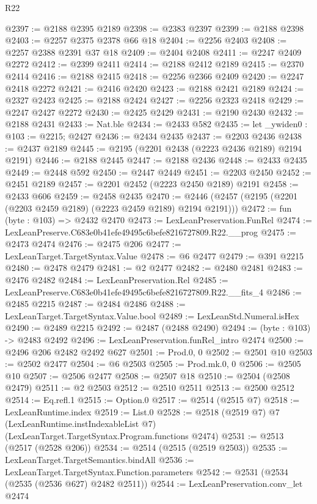 \begin{lexlean}{R22}
\begin{coremodule}
@2397 := @2188 @2395 @2189
@2398 := @2383 @2397
@2399 := @2188 @2398
@2403 := @2257 @2375 @2378 @66 @18
@2404 := @2256 @2403
@2408 := @2257 @2388 @2391 @37 @18
@2409 := @2404 @2408
@2411 := @2247 @2409 @2272
@2412 := @2399 @2411
@2414 := @2188 @2412 @2189
@2415 := @2370 @2414
@2416 := @2188 @2415
@2418 := @2256 @2366 @2409
@2420 := @2247 @2418 @2272
@2421 := @2416 @2420
@2423 := @2188 @2421 @2189
@2424 := @2327 @2423
@2425 := @2188 @2424
@2427 := @2256 @2323 @2418
@2429 := @2247 @2427 @2272
@2430 := @2425 @2429
@2431 := @2190 @2430
@2432 := @2188 @2431
@2433 := Nat.ble
@2434 := @2433 @582
@2435 := let _ywiden0 : @103 := @2215; @2427
@2436 := @2434 @2435
@2437 := @2203 @2436
@2438 := @2437 @2189
@2445 := @2195 (@2201 @2438 (@2223 @2436 @2189) @2194 @2191)
@2446 := @2188 @2445
@2447 := @2188 @2436
@2448 := @2433 @2435
@2449 := @2448 @592
@2450 := @2447 @2449
@2451 := @2203 @2450
@2452 := @2451 @2189
@2457 := @2201 @2452 (@2223 @2450 @2189) @2191
@2458 := @2433 @606
@2459 := @2458 @2435
@2470 := @2446 (@2457 (@2195 (@2201 (@2203 @2459 @2189) (@2223 @2459 @2189) @2194 @2191)))
@2472 := fun (byte : @103) => @2432 @2470
@2473 := LexLeanPreservation.FunRel
@2474 := LexLeanPreserve.C683e0b41efe49495c6befe8216727809.R22.__prog
@2475 := @2473 @2474
@2476 := @2475 @206
@2477 := LexLeanTarget.TargetSyntax.Value
@2478 := @6 @2477
@2479 := @391 @2215
@2480 := @2478 @2479
@2481 := @2 @2477
@2482 := @2480 @2481
@2483 := @2476 @2482
@2484 := LexLeanPreservation.Rel
@2485 := LexLeanPreserve.C683e0b41efe49495c6befe8216727809.R22.__fits_4
@2486 := @2485 @2215
@2487 := @2484 @2486
@2488 := LexLeanTarget.TargetSyntax.Value.bool
@2489 := LexLeanStd.Numeral.isHex
@2490 := @2489 @2215
@2492 := @2487 (@2488 @2490)
@2494 := (byte : @103) -> @2483 @2492
@2496 := LexLeanPreservation.funRel_intro @2474
@2500 := @2496 @206 @2482 @2492 @627
@2501 := Prod.{0, 0}
@2502 := @2501 @10
@2503 := @2502 @2477
@2504 := @6 @2503
@2505 := Prod.mk.{0, 0}
@2506 := @2505 @10
@2507 := @2506 @2477
@2508 := @2507 @18
@2510 := @2504 (@2508 @2479)
@2511 := @2 @2503
@2512 := @2510 @2511
@2513 := @2500 @2512
@2514 := Eq.refl.{1}
@2515 := Option.{0}
@2517 := @2514 (@2515 @7)
@2518 := LexLeanRuntime.index
@2519 := List.{0}
@2528 := @2518
    (@2519 @7)
    @7
    (LexLeanRuntime.instIndexableList @7)
    (LexLeanTarget.TargetSyntax.Program.functions @2474)
@2531 := @2513 (@2517 (@2528 @206))
@2534 := @2514 (@2515 (@2519 @2503))
@2535 := LexLeanTarget.TargetSemantics.bindAll
@2536 := LexLeanTarget.TargetSyntax.Function.parameters
@2542 := @2531 (@2534 (@2535 (@2536 @627) @2482 @2511))
@2544 := LexLeanPreservation.conv_let @2474

\end{coremodule}
\end{lexlean}
